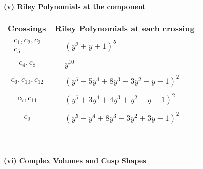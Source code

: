 \documentclass[1p]{elsarticle_modified}
\theoremstyle{definition}
\begin{document}
\newpage\renewcommand{\arraystretch}{1}
\flushleft \textbf{(v) Riley Polynomials at the component}\newline \\
\begin{tabular}{m{50pt}|m{274pt}}
Crossings & \hspace{64pt}Riley Polynomials at each crossing \\
\hline $$\begin{aligned}c_{1},c_{2},c_{3}\\c_{5}\end{aligned}$$&$\begin{aligned}
&(y^2+y+1)^5
\end{aligned}$\\
\hline $$\begin{aligned}c_{4},c_{8}\end{aligned}$$&$\begin{aligned}
&y^{10}
\end{aligned}$\\
\hline $$\begin{aligned}c_{6},c_{10},c_{12}\end{aligned}$$&$\begin{aligned}
&(y^5-5 y^4+8 y^3-3 y^2- y-1)^2
\end{aligned}$\\
\hline $$\begin{aligned}c_{7},c_{11}\end{aligned}$$&$\begin{aligned}
&(y^5+3 y^4+4 y^3+y^2- y-1)^2
\end{aligned}$\\
\hline $$\begin{aligned}c_{9}\end{aligned}$$&$\begin{aligned}
&(y^5- y^4+8 y^3-3 y^2+3 y-1)^2
\end{aligned}$\\
\hline
\end{tabular}\\~\\
\newpage\flushleft \textbf{(vi) Complex Volumes and Cusp Shapes}
\end{document}

